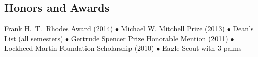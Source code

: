 
\subsection*{Honors and Awards}

Frank H.\ T.\ Rhodes Award (2014) $\bullet$ Michael W. Mitchell Prize (2013) $\bullet$ Dean's List (all semesters) $\bullet$ Gertrude Spencer Prize Honorable Mention (2011) $\bullet$ Lockheed Martin Foundation Scholarship (2010) $\bullet$ Eagle Scout with 3 palms
